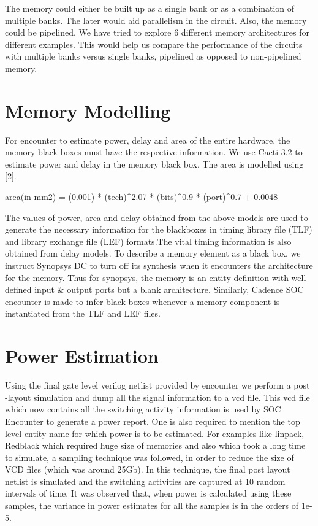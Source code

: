 \documentclass[a4paper, twoside]{article}      %
\begin{document}
{The memory could either be built up as a single bank or as a combination of multiple banks. The later would aid parallelism in the circuit. Also, the memory could be pipelined. We have tried to explore 6 different memory architectures for different examples. This would help us compare the performance of the circuits with multiple banks versus single banks, pipelined as opposed to non-pipelined memory. 
}
\section{Memory Modelling}
For encounter to estimate power, delay and area of the entire hardware, the memory black boxes must have the respective information. We use Cacti 3.2 to estimate power and delay in the memory black box. The area is modelled using  [2].

area(in mm2) = (0.001){ * }(tech)^{2.07} { * } (bits)^{0.9} { * } (port)^{0.7} + {0.0048}

The values of power, area and delay obtained from the above models are used to generate the necessary information for the blackboxes in timing library file (TLF) and library exchange file (LEF) formats.The vital timing information is also obtained from delay models. 
To describe a memory element as a black box, we instruct Synopsys DC to turn off its synthesis when it encounters the architecture for the memory.
Thus for synopsys, the memory is an entity definition with well defined input & output ports but a blank architecture.
Similarly, Cadence SOC encounter is made to infer black boxes whenever a memory component is instantiated from the TLF and LEF files.

\section{Power Estimation}
Using the final gate level verilog netlist provided by encounter we perform a post -layout simulation and dump all the signal information to a vcd file. This vcd file which now contains all the switching activity information is used by SOC Encounter to generate a power report. One is also required to mention the top level entity name for which power is to be estimated.
For examples like linpack, Redblack which required huge size of memories and also which took a long time to simulate, a sampling technique was followed, in order to reduce the size of VCD files (which was around 25Gb). In this technique, the final post layout netlist is simulated and the switching activities are captured at 10 random intervals of time. It was observed that, when power is calculated using these samples, the variance in power estimates for all the samples is in the orders of 1e-5.  
\end{document}

